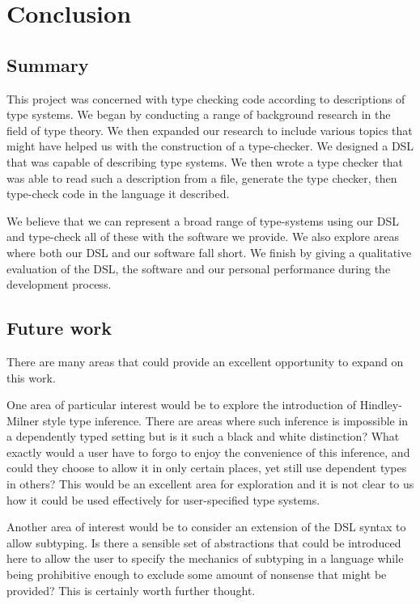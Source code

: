 \chapter{Conclusion}

\section{Summary}

This project was concerned with type checking code according to
descriptions of type systems. We began
by conducting a range of background research in the field of
type theory. We then expanded our research to include various topics
that might have helped us with the construction of a type-checker. We
designed a DSL that was capable of describing type systems. We then
wrote a type checker that was able to read such a description from a 
file, generate the type checker, then type-check code in the language it
described.

We believe that we can represent a broad range of
type-systems using our DSL and type-check all of these with the software we
provide. We also explore areas where both our DSL and our software
fall short. We finish by giving a qualitative evaluation of the DSL,
the software and our personal performance during the development
process. 

\section{Future work}

There are many areas that could provide an excellent opportunity to
expand on this work.

One area of particular interest would be to explore the introduction
of Hindley-Milner style type inference. There are areas where
such inference is impossible in a dependently typed setting but is it
such a black and white distinction? What exactly would a user have to
forgo to enjoy the convenience of this inference, and could
they choose to allow it in only certain places, yet still use
dependent types in others? This would be an excellent area for
exploration and it is not clear to us how it could be used effectively
for user-specified type systems.

Another area of interest would be to consider an extension of the DSL
syntax to allow subtyping. Is there a sensible set of abstractions
that could be introduced here to allow the user to specify the
mechanics of subtyping in a language while being prohibitive enough to
exclude some amount of nonsense that might be provided? This is
certainly worth further thought.


